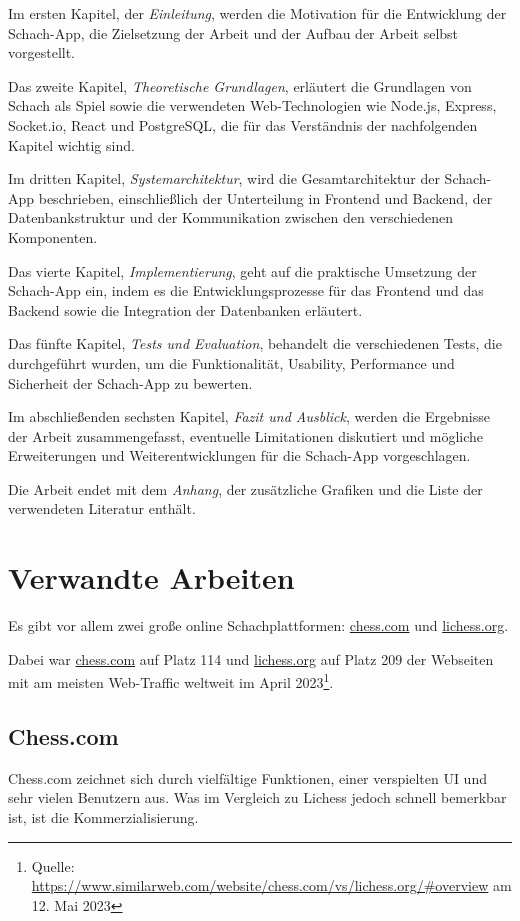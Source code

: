 Im ersten Kapitel, der \textit{Einleitung}, werden die Motivation für die Entwicklung der Schach-App, die Zielsetzung der Arbeit und der Aufbau der Arbeit selbst vorgestellt.

Das zweite Kapitel, \textit{Theoretische Grundlagen}, erläutert die Grundlagen von Schach als Spiel sowie die verwendeten Web-Technologien wie Node.js, Express, Socket.io, React und PostgreSQL, die für das Verständnis der nachfolgenden Kapitel wichtig sind.

Im dritten Kapitel, \textit{Systemarchitektur}, wird die Gesamtarchitektur der Schach-App beschrieben, einschließlich der Unterteilung in Frontend und Backend, der Datenbankstruktur und der Kommunikation zwischen den verschiedenen Komponenten.

Das vierte Kapitel, \textit{Implementierung}, geht auf die praktische Umsetzung der Schach-App ein, indem es die Entwicklungsprozesse für das Frontend und das Backend sowie die Integration der Datenbanken erläutert.

Das fünfte Kapitel, \textit{Tests und Evaluation}, behandelt die verschiedenen Tests, die durchgeführt wurden, um die Funktionalität, Usability, Performance und Sicherheit der Schach-App zu bewerten.

Im abschließenden sechsten Kapitel, \textit{Fazit und Ausblick}, werden die Ergebnisse der Arbeit zusammengefasst, eventuelle Limitationen diskutiert und mögliche Erweiterungen und Weiterentwicklungen für die Schach-App vorgeschlagen.

Die Arbeit endet mit dem \textit{Anhang}, der zusätzliche Grafiken und die Liste der verwendeten Literatur enthält.

\section{Verwandte Arbeiten}
Es gibt vor allem zwei große online Schachplattformen: \url{chess.com} und \url{lichess.org}.

Dabei war \url{chess.com} auf Platz 114 und \url{lichess.org} auf Platz 209 der Webseiten mit am meisten Web-Traffic weltweit im April 2023\footnote{Quelle: \url{https://www.similarweb.com/website/chess.com/vs/lichess.org/#overview} am 12. Mai 2023}.

\subsection{Chess.com}
Chess.com zeichnet sich durch vielfältige Funktionen, einer verspielten UI und sehr vielen Benutzern aus. Was im Vergleich zu Lichess jedoch schnell bemerkbar ist, ist die Kommerzialisierung.

